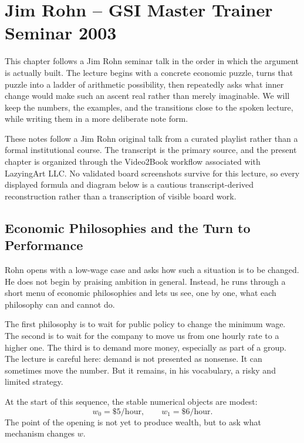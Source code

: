 \chapter{Jim Rohn -- GSI Master Trainer Seminar 2003}

This chapter follows a Jim Rohn seminar talk in the order in which the argument is actually built. The lecture begins with a concrete economic puzzle, turns that puzzle into a ladder of arithmetic possibility, then repeatedly asks what inner change would make such an ascent real rather than merely imaginable. We will keep the numbers, the examples, and the transitions close to the spoken lecture, while writing them in a more deliberate note form.

\begin{remark}
These notes follow a Jim Rohn original talk from a curated playlist rather than a formal institutional course. The transcript is the primary source, and the present chapter is organized through the Video2Book workflow associated with LazyingArt LLC. No validated board screenshots survive for this lecture, so every displayed formula and diagram below is a cautious transcript-derived reconstruction rather than a transcription of visible board work.
\end{remark}

\section{Economic Philosophies and the Turn to Performance}

Rohn opens with a low-wage case and asks how such a situation is to be changed. He does not begin by praising ambition in general. Instead, he runs through a short menu of economic philosophies and lets us see, one by one, what each philosophy can and cannot do.

The first philosophy is to wait for public policy to change the minimum wage. The second is to wait for the company to move us from one hourly rate to a higher one. The third is to demand more money, especially as part of a group. The lecture is careful here: demand is not presented as nonsense. It can sometimes move the number. But it remains, in his vocabulary, a risky and limited strategy.

At the start of this sequence, the stable numerical objects are modest:
\begin{equation}
w_0=\$5/\text{hour}, \qquad w_1=\$6/\text{hour}.
\end{equation}
The point of the opening is not yet to produce wealth, but to ask what mechanism changes \(w\).


